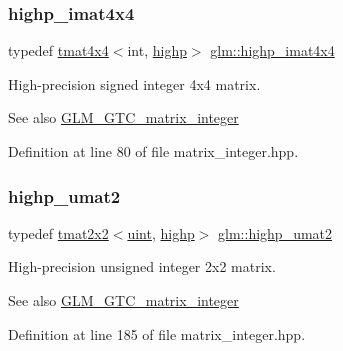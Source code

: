 \subsubsection{\texorpdfstring{highp\_imat4x4}{highp\_imat4x4}}
{\footnotesize\ttfamily typedef \mbox{\hyperlink{structglm_1_1tmat4x4}{tmat4x4}}$<$int, \mbox{\hyperlink{namespaceglm_a0f04f086094c747d227af4425893f545ac6f7eab42eacbb10d59a58e95e362074}{highp}}$>$ \mbox{\hyperlink{group__gtc__matrix__integer_ga2a80b8ab686297145ecf713699233114}{glm\+::highp\+\_\+imat4x4}}}

High-\/precision signed integer 4x4 matrix. \begin{DoxySeeAlso}{See also}
\mbox{\hyperlink{group__gtc__matrix__integer}{G\+L\+M\+\_\+\+G\+T\+C\+\_\+matrix\+\_\+integer}} 
\end{DoxySeeAlso}


Definition at line 80 of file matrix\+\_\+integer.\+hpp.

\mbox{\label{group__gtc__matrix__integer_ga113fe97aa8688eaa287a02f8362f3e47}} 
\subsubsection{\texorpdfstring{highp\_umat2}{highp\_umat2}}
{\footnotesize\ttfamily typedef \mbox{\hyperlink{structglm_1_1tmat2x2}{tmat2x2}}$<$\mbox{\hyperlink{group__core__precision_ga4fd29415871152bfb5abd588334147c8}{uint}}, \mbox{\hyperlink{namespaceglm_a0f04f086094c747d227af4425893f545ac6f7eab42eacbb10d59a58e95e362074}{highp}}$>$ \mbox{\hyperlink{group__gtc__matrix__integer_ga113fe97aa8688eaa287a02f8362f3e47}{glm\+::highp\+\_\+umat2}}}

High-\/precision unsigned integer 2x2 matrix. \begin{DoxySeeAlso}{See also}
\mbox{\hyperlink{group__gtc__matrix__integer}{G\+L\+M\+\_\+\+G\+T\+C\+\_\+matrix\+\_\+integer}} 
\end{DoxySeeAlso}


Definition at line 185 of file matrix\+\_\+integer.\+hpp.

\mbox{\label{group__gtc__matrix__integer_gaeb546847abfc7c3c09ea8172987ebb16}} 
